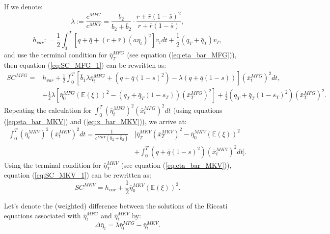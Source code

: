 \documentclass[11pt]{article}
\begin{document}
If we denote:
\begin{equation}
\lambda := \frac{c^{MFG}}{c^{MKV}} = \frac{b_2}{b_2 + \bar{b}_2}\cdot \frac{ r + \bar{r}(1-\bar{s})^2 }{r + \bar{r}(1-\bar{s})},
\label{eq:lambda}
\end{equation}
\begin{equation*}
h_{var}: = \frac{1}{2}\int_0^T \left[q+\bar{q}+(r+\bar{r})(a\eta_t)^2\right]v_tdt + \frac{1}{2}(q_T+\bar{q}_T)v_T,
\end{equation*}
and use the terminal condition for $\bar{\eta}^{MFG}_T$ (see equation (\ref{eq:eta_bar_MFG})), then equation (\ref{eq:SC_MFG_1}) can be rewritten as:
\begin{equation}
\begin{split}
SC^{MFG} = & h_{var} +  \frac{1}{2} \int_0^T \left[ \bar{b}_1 \lambda \bar{\eta}_t^{MFG} + (q+ \bar{q}(1-s)^2) - \lambda (q + \bar{q}(1-s)) \right] (\bar{x}_t^{MFG})^2 dt, \\
& + \frac{1}{2} \lambda \left[ \bar{\eta}^{MFG}_0 (\mathbb{E}(\xi))^2 - (q_T+\bar{q}_T(1-s_T)) (\bar{x}_T^{MFG})^2 \right] + \frac{1}{2} (q_T+\bar{q}_T(1-s_T)^2)(\bar{x}_T^{MFG})^2.
\end{split}
\label{eq:SC_MFG_2}
\end{equation}
Repeating the calculation for $\int_0^T (\bar{\eta}^{MFG}_t)^2 (\bar{x}^{MFG}_t)^2 dt$ (using equations (\ref{eq:eta_bar_MKV}) and (\ref{eq:x_bar_MKV})), we arrive at:
\begin{equation*}
\begin{split}
\int_0^T (\bar{\eta}^{MKV}_t)^2 (\bar{x}^{MKV}_t)^2 dt=\frac{1}{c^{MKV}(b_2 + \bar{b}_2)} &\Bigg[ \bar{\eta}^{MKV}_T (\bar{x}^{MKV}_T)^2 - \bar{\eta}^{MKV}_0 (\mathbb{E}(\xi))^2 \\
&+ \int_0^T (q+\bar{q}(1-s)^2) (\bar{x}^{MKV}_t)^2 dt \Bigg].
\end{split}
\end{equation*}
Using the terminal condition for $\bar{\eta}^{MKV}_T$ (see equation (\ref{eq:eta_bar_MKV})), equation (\ref{eq:SC_MKV_1}) can be rewritten as:
\begin{equation}
SC^{MKV} = h_{var} + \frac{1}{2} \bar{\eta}^{MKV}_0 (\mathbb{E}(\xi))^2.
\label{eq:SC_MKV_2}
\end{equation}

Let's denote the (weighted) difference between the solutions of the Riccati equations associated with $\bar{\eta}_t^{MFG}$ and $\bar{\eta}_t^{MKV}$ by:
\begin{equation}
	\Delta \bar{\eta}_t = \lambda \bar{\eta}_t^{MFG} - \bar{\eta}_t^{MKV} .
\label{eq:delta_eta}
\end{equation} 
\end{document}
